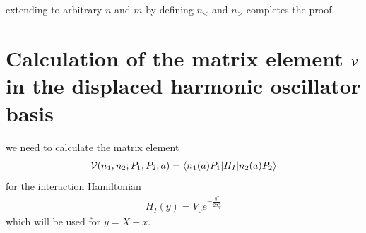 extending to arbitrary $n$ and $m$ by defining $n_<$ and $n_>$ completes the proof.
\newpage

\section{Calculation of the matrix element ${\cal V}$ in the displaced harmonic oscillator basis}\label{sec:osc-V-matrix-element}

we need to calculate the matrix element
\begin{align}
  {\cal V}(n_1,n_2;P_1,P_2;a)= \langle n_1(a) P_1|H_I|n_2(a) P_2\rangle
\end{align}
for the interaction Hamiltonian
\begin{align}
  H_I(y) = V_0 e^{-\frac{y^2}{2\sigma_V^2}}
\end{align}
which will be used for $y = X-x$.

